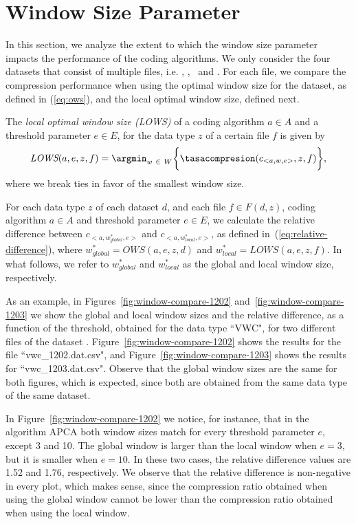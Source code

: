 
\clearpage
\section{Window Size Parameter}
\label{secX:windows}


In this section, we analyze the extent to which the window size parameter impacts the performance of the coding algorithms. We only consider the four datasets that consist of multiple files, i.e. \datasetirkis, \datasetsst, \datasetadcp \ and \datasetsolar. For each file, we compare the compression performance when using the optimal window size for the dataset, as defined in (\ref{eq:ows}), and the local optimal window size, defined next.


\newcommand{\lows}{\textit{LOWS}}
\begin{defcion}
The \textit{local optimal window size (\lows)} of a coding algorithm $a \in A$ and a threshold parameter $e \in E$, for the data type $z$ of a certain file $f$ is given by
\begin{equation}
\lows(a, e, z, f) = \argmin_{w\ \in \ W} \biggl\{ \tasacompresion(c_{<a, w, e>}, z, f) \biggr\},
\end{equation}
where we break ties in favor of the smallest window size.
\end{defcion}


For each data type $z$ of each dataset $d$, and each file $f \in F(d, z)$, coding algorithm $a \in A$ and threshold parameter $e \in E$, we calculate the relative difference between $c_{<a, w_{global}^{*}, e>}$ and $c_{<a, w_{local}^{*}, e>}$, as defined in~(\ref{eq:relative-difference}), where $w_{global}^{*}=OWS(a, e, z, d)$ and $w_{local}^{*}=LOWS(a, e, z, f)$. In what follows, we refer to $w_{global}^{*}$ and $w_{local}^{*}$ as the global and local window size, respectively.


As an example, in Figures~\ref{fig:window-compare-1202} and~\ref{fig:window-compare-1203} we show the global and local window sizes and the relative difference, as a function of the threshold, obtained for the data type ``VWC", for two different files of the dataset \datasetirkis. Figure~\ref{fig:window-compare-1202} shows the results for the file ``vwc\_1202.dat.csv", and Figure~\ref{fig:window-compare-1203} shows the results for ``vwc\_1203.dat.csv". Observe that the global window sizes are the same for both figures, which is expected, since both are obtained from the same data type of the same dataset.


In Figure~\ref{fig:window-compare-1202} we notice, for instance, that in the algorithm APCA both window sizes match for every threshold parameter $e$, except 3 and 10. The global window is larger than the local window when $e=3$, but it is smaller when $e=10$. In these two cases, the relative difference values are 1.52 and 1.76, respectively. We observe that the relative difference is non-negative in every plot, which makes sense, since the compression ratio obtained when using the global window cannot be lower than the compression ratio obtained when using the local window.


